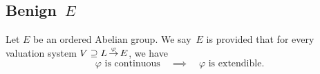 \documentclass[main.tex]{subfiles}
\begin{document}
\subsection{Benign~$E$}
\begin{dfn}
\label{D:benign}
Let $E$ be an ordered Abelian group.
We say~$E$ is  provided 
that for every valuation system
$V \supseteq L\,\smash{\stackrel{\varphi}{\rightarrow}}\,E$,
we have
\begin{equation*}
\varphi\text{ is continuous}
\quad\implies\quad
\varphi\text{ is extendible}.
\end{equation*}
\end{dfn}
\end{document}
